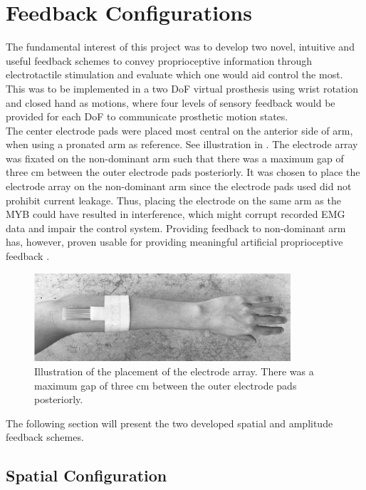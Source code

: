 \section{Feedback Configurations} \label{sec:feed}

The fundamental interest of this project was to develop two novel, intuitive and useful feedback schemes to convey proprioceptive information through electrotactile stimulation and evaluate which one would aid control the most. This was to be implemented in a two DoF virtual prosthesis using wrist rotation and closed hand as motions, where four levels of sensory feedback would be provided for each DoF to communicate prosthetic motion states. \\
The center electrode pads were placed most central on the anterior side of arm, when using a pronated arm as reference. See illustration in . The electrode array was fixated on the non-dominant arm such that there was a maximum gap of three cm between the outer electrode pads posteriorly. It was chosen to place the electrode array on the non-dominant arm since the electrode pads used did not prohibit current leakage. Thus, placing the electrode on the same arm as the MYB could have resulted in interference, which might corrupt recorded EMG data and impair the control system. Providing feedback to non-dominant arm has, however, proven usable for providing meaningful artificial proprioceptive feedback \cite{Pistohl2015}.  

\begin{figure}[H]                 
	\includegraphics[width=0.85\textwidth]{figures/elec_place}  
	\caption{Illustration of the placement of the electrode array. There was a maximum gap of three cm between the outer electrode pads posteriorly.}
	\label{fig:meth:elec_place} 
\end{figure} The following section will present the two developed spatial and amplitude feedback schemes. 

\subsection{Spatial Configuration}

